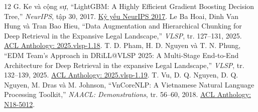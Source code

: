 \documentclass[12pt,a4paper]{article}
\begin{document}
\begin{thebibliography}{12}
 G. Ke và cộng sự, ``LightGBM: A Highly Efficient Gradient Boosting Decision Tree,'' \textit{NeurIPS}, tập 30, 2017. \href{https://proceedings.neurips.cc/paper/2017/hash/6449f44a102fde848669bdd9eb6b76fa-Abstract.html}{Kỷ yếu NeurIPS 2017}.
 Le Ba Hoai, Dinh Van Hung và Tran Bao Hieu, ``Data Augmentation and Hierarchical Chunking for Deep Retrieval in the Expansive Legal Landscape,'' \textit{VLSP}, tr. 127--131, 2025. \href{https://aclanthology.org/2025.vlsp-1.18/}{ACL Anthology: 2025.vlsp-1.18}.
 T. D. Pham, H. D. Nguyen và T. N. Phung, ``EDM Team's Approach in DRiLL@VLSP 2025: A Multi-Stage End-to-End Architecture for Deep Retrieval in the expansive Legal Landscape,'' \textit{VLSP}, tr. 132--139, 2025. \href{https://aclanthology.org/2025.vlsp-1.19/}{ACL Anthology: 2025.vlsp-1.19}.
 T. Vu, D. Q. Nguyen, D. Q. Nguyen, M. Dras và M. Johnson, ``VnCoreNLP: A Vietnamese Natural Language Processing Toolkit,'' \textit{NAACL: Demonstrations}, tr. 56--60, 2018. \href{https://aclanthology.org/N18-5012/}{ACL Anthology: N18-5012}.
\end{thebibliography}
\endgroup
\end{document}
